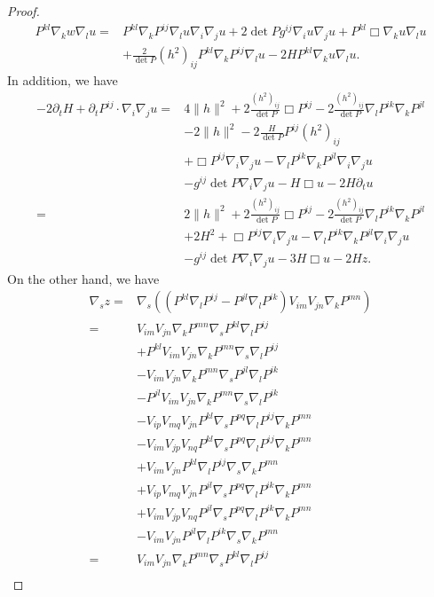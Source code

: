 \documentclass{amsart}
\theoremstyle{definition}
\theoremstyle{remark}
\numberwithin{equation}{section}
\begin{document}
\begin{proof}
\begin{align*}
P^{kl}\nabla_k w\nabla_lu
=&P^{kl}\nabla_kP^{ij}\nabla_lu\nabla_i\nabla_ju+2\det Pg^{ij}\nabla_iu\nabla_ju+P^{kl}\Box\nabla_ku\nabla_lu\\
&+\frac{2}{\det P}(h^2)_{ij}P^{kl}\nabla_kP^{ij}\nabla_lu-2HP^{kl}\nabla_ku\nabla_lu.
\end{align*}
In addition, we have
\begin{align*}
-2\partial_tH+\partial_tP^{ij}\cdot\nabla_i\nabla_ju=&4\|h\|^2+2\frac{(h^2)_{ij}}{\det P}\Box P^{ij}-2\frac{(h^2)_{ij}}{\det P}\nabla_lP^{ik}\nabla_kP^{jl}\\
&-2\|h\|^2-2\frac{H}{\det P}P^{ij}(h^2)_{ij}\\
&+\Box P^{ij}\nabla_i\nabla_ju-\nabla_lP^{ik}\nabla_kP^{jl}\nabla_i\nabla_ju\\
&-g^{ij}\det P\nabla_i\nabla_ju-H\Box u-2H\partial_tu\\
=&2\|h\|^2+2\frac{(h^2)_{ij}}{\det P}\Box P^{ij}-2\frac{(h^2)_{ij}}{\det P}\nabla_lP^{ik}\nabla_kP^{jl}\\
&+2H^2+\Box P^{ij}\nabla_i\nabla_ju-\nabla_lP^{ik}\nabla_kP^{jl}\nabla_i\nabla_ju\\
&-g^{ij}\det P\nabla_i\nabla_ju-3H\Box u-2Hz.
\end{align*}
On the other hand, we have
\begin{align*}
\nabla_s z=&\nabla_s\left(\left(P^{kl}\nabla_l P^{ij}-P^{jl}\nabla_lP^{ik}\right)V_{im}V_{jn}\nabla_kP^{mn}\right)\\
=&V_{im}V_{jn}\nabla_kP^{mn}\nabla_s P^{kl}\nabla_l P^{ij}\\
&+P^{kl}V_{im}V_{jn}\nabla_kP^{mn}\nabla_s\nabla_l P^{ij}\\
&-V_{im}V_{jn}\nabla_kP^{mn}\nabla_sP^{jl}\nabla_lP^{ik}\\
&-P^{jl}V_{im}V_{jn}\nabla_kP^{mn}\nabla_s\nabla_lP^{ik}\\
&-V_{ip}V_{mq}V_{jn}P^{kl}\nabla_sP^{pq}\nabla_l P^{ij}\nabla_kP^{mn}\\
&-V_{im}V_{jp}V_{nq}P^{kl}\nabla_sP^{pq}\nabla_l P^{ij}\nabla_kP^{mn}\\
&+V_{im}V_{jn}P^{kl}\nabla_l P^{ij}\nabla_s\nabla_kP^{mn}\\
&+V_{ip}V_{mq}V_{jn}P^{jl}\nabla_sP^{pq}\nabla_lP^{ik}\nabla_kP^{mn}\\
&+V_{im}V_{jp}V_{nq}P^{jl}\nabla_sP^{pq}\nabla_lP^{ik}\nabla_kP^{mn}\\
&-V_{im}V_{jn}P^{jl}\nabla_lP^{ik}\nabla_s\nabla_kP^{mn}\\
=&V_{im}V_{jn}\nabla_kP^{mn}\nabla_s P^{kl}\nabla_l P^{ij}\\

\end{align*}
\end{proof}
\end{document}
